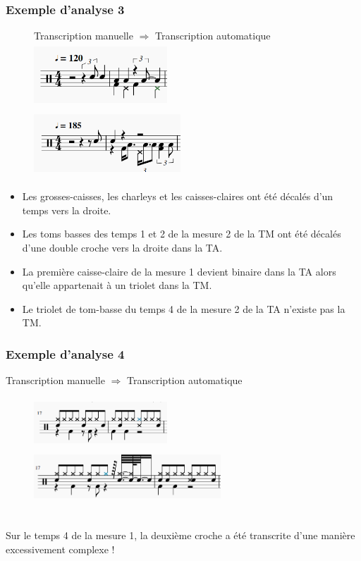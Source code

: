 \subsubsection{Exemple d’analyse 3}
\begin{figure}[h]
	\centering
	Transcription manuelle $\Rightarrow$ Transcription automatique
	\includegraphics[height=24mm, width=50mm]{z_images/4_experimentations/1_analyse_midi_audio/0_drummer1_session3/3_manuelle.png}\ \ \ \ 
	\includegraphics[height=25mm, width=55mm]{z_images/4_experimentations/1_analyse_midi_audio/0_drummer1_session3/2_musescore.png}
\end{figure}
\begin{itemize}
	\item Les grosses-caisses, les charleys et les caisses-claires ont été décalés d’un temps vers la droite.
	\item Les toms basses des temps 1 et 2 de la mesure 2 de la TM ont été décalés d’une double croche vers la droite dans la TA.
	\item La première caisse-claire de la mesure 1 devient binaire dans la TA alors qu’elle appartenait à un triolet dans la TM.
	\item Le triolet de tom-basse du temps 4 de la mesure 2 de la TA n’existe pas la TM.\\
\end{itemize}
\subsubsection{Exemple d’analyse 4}
\tab \tab Transcription manuelle $\Rightarrow$ Transcription automatique
\begin{figure}[h]
	\centering
	\includegraphics[height=19mm, width=50mm]{z_images/4_experimentations/1_analyse_midi_audio/1_drummer1_session1/3_manuelle.png}\ \ \ \ 
	\includegraphics[height=19mm, width=70mm]{z_images/4_experimentations/1_analyse_midi_audio/1_drummer1_session1/2_musescore.png}
\end{figure}\\
Sur le temps 4 de la mesure 1, la deuxième croche a été transcrite d’une manière excessivement complexe !\newpage
